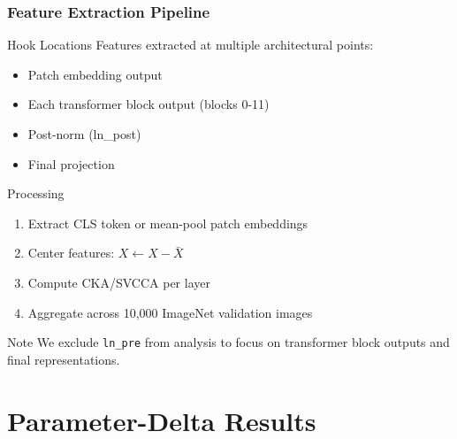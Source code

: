 \documentclass[aspectratio=1610, fontsize=8pt]{beamer}
\begin{document}
\begin{frame}
    \frametitle{Feature Extraction Pipeline}
    \begin{block}{Hook Locations}
        Features extracted at multiple architectural points:
        \begin{itemize}
            \item Patch embedding output
            \item Each transformer block output (blocks 0-11)
            \item Post-norm (ln\_post)
            \item Final projection
        \end{itemize}
    \end{block}
    
    \begin{block}{Processing}
        \begin{enumerate}
            \item Extract CLS token or mean-pool patch embeddings
            \item Center features: $X \leftarrow X - \bar{X}$
            \item Compute CKA/SVCCA per layer
            \item Aggregate across 10,000 ImageNet validation images
        \end{enumerate}
    \end{block}
    
    \vspace{0.3cm}
    \begin{alertblock}{Note}
        We exclude \texttt{ln\_pre} from analysis to focus on transformer block outputs and final representations.
    \end{alertblock}
\end{frame}

\section{Parameter-Delta Results}
\end{document}
